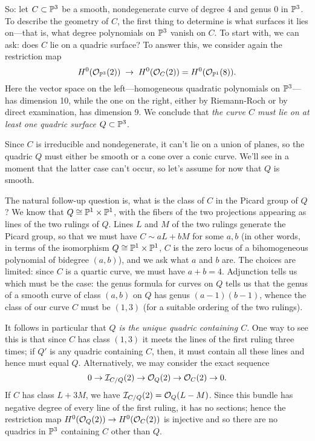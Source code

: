 So: let $C \subset \PP^3$ be a smooth, nondegenerate curve of degree 4 and genus 0 in $\PP^3$. To describe the geometry of $C$, the first thing to determine is what surfaces it lies on---that is, what degree polynomials on $\PP^3$ vanish on $C$. To start with, we can ask: does $C$ lie on a quadric surface? To answer this, we consider again the restriction map
$$
H^0(\cO_{\PP^3}(2)) \; \to \; H^0(\cO_{C}(2)) = H^0(\cO_{\PP^1}(8)).
$$
Here the vector space on the left---homogeneous quadratic polynomials on $\PP^3$---has dimension 10, while the one on the right, either by Riemann-Roch or by direct examination, has dimension 9. We conclude that \emph{the curve $C$ must lie on at least one quadric surface $Q \subset \PP^3$}.

Since $C$ is irreducible and nondegenerate, it can't lie on a union of planes, so the quadric $Q$ must either be smooth or a cone over a conic curve. We'll see in a moment that the latter case can't occur, so let's assume for now that $Q$ is smooth. 

The natural follow-up question is, what is the class of $C$ in the Picard group of $Q$? We know that $Q \cong \PP^1 \times \PP^1$, with the fibers of the two projections appearing as lines of the two rulings of $Q$. Lines $L$ and $M$ of the two rulings generate the Picard group, so that we must have $C \sim aL + bM$ for some $a, b$ (in other words, in terms of the isomorphism $Q \cong \PP^1 \times \PP^1$, $C$ is the zero locus of a bihomogeneous polynomial of bidegree $(a,b)$), and we ask what $a$ and $b$ are. The choices are limited: since $C$ is a quartic curve, we must have $a+b = 4$. Adjunction tells us which must be the case: the genus formula for curves on $Q$ tells us that the genus of a smooth curve of class $(a,b)$ on $Q$ has genus $(a-1)(b-1)$, whence the class of our curve $C$ must be $(1,3)$ (for a suitable ordering of the two rulings).

It follows in particular that \emph{$Q$ is the unique quadric containing $C$}. One way to see this is that since $C$ has class $(1,3)$ it meets the lines of the first ruling three times; if $Q'$ is any quadric containing $C$, then, it must contain all these lines and hence must equal $Q$. Alternatively, we may consider the exact sequence
$$
0 \to \cI_{C/Q}(2) \to \cO_Q(2)  \to \cO_C(2) \to 0.
$$
If $C$ has class $L+3M$, we have $\cI_{C/Q}(2) = \cO_{Q}(L-M)$. Since this bundle has negative degree of every line of the first ruling, it has no sections; hence the restriction map $H^0(\cO_Q(2))  \to H^0(\cO_C(2))$ is injective and so there are no  quadrics in $\PP^3$ containing $C$ other than $Q$.

